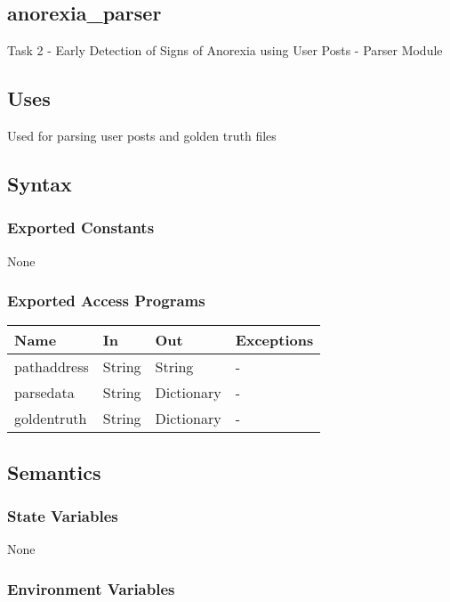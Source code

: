 \documentclass[12pt, titlepage]{article}
\begin{document}
\subsection{anorexia\_parser}

Task 2 - Early Detection of Signs of Anorexia using User Posts - Parser Module

\subsection{Uses}

Used for parsing user posts and golden truth files

\subsection{Syntax}

\subsubsection{Exported Constants}

None

\subsubsection{Exported Access Programs}

\begin{center}
\begin{tabular}{p{3.5cm} p{4.5cm} p{3cm} p{2cm}}
\hline
\textbf{Name} & \textbf{In} & \textbf{Out} & \textbf{Exceptions} \\
\hline
pathaddress & String & String & - \\
parsedata & String & Dictionary & - \\
goldentruth & String & Dictionary & - \\
\hline
\end{tabular}
\end{center}

\subsection{Semantics}

\subsubsection{State Variables}

None

\subsubsection{Environment Variables}
\end{document}
